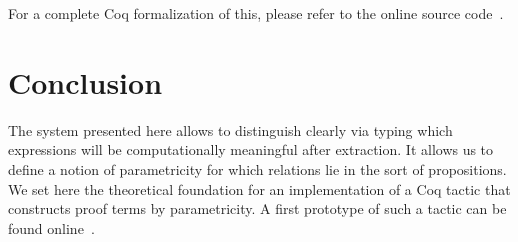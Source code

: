 \documentclass[conference,a4paper]{IEEEtran}
\def\coq{\textsf{Coq}\xspace}
\begin{document}
For a complete \coq formalization of this, please refer to the 
online source code~\cite{implem12}.

\section{Conclusion}

The system presented here allows to distinguish clearly via typing which
expressions will be computationally meaningful after extraction. It allows us
to define a notion of parametricity for which relations lie in the sort of
propositions. We set here the theoretical foundation for an implementation of a
\coq tactic that constructs proof terms by parametricity. A first prototype of such
a tactic can be found online~\cite{implem12}.



\end{document}

